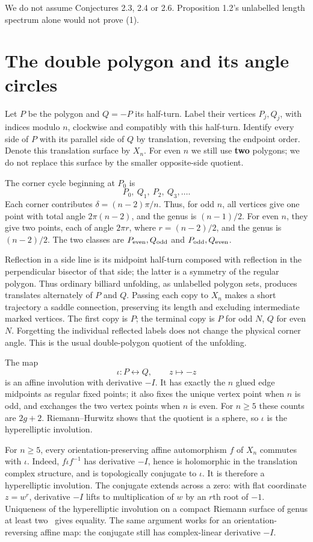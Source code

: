 \documentclass[11pt]{article}
\begin{document}
We do not assume Conjectures 2.3, 2.4 or 2.6. Proposition 1.2's unlabelled length spectrum alone would not prove (1).

\section{The double polygon and its angle circles}

Let \(P\) be the polygon and \(Q=-P\) its half-turn. Label their vertices \(P_j,Q_j\), with indices modulo \(n\), clockwise and compatibly with this half-turn. Identify every side of \(P\) with its parallel side of \(Q\) by translation, reversing the endpoint order. Denote this translation surface by \(X_n\). For even \(n\) we still use \textbf{two} polygons; we do not replace this surface by the smaller opposite-side quotient.

The corner cycle beginning at \(P_0\) is
\[
P_0,\ Q_1,\ P_2,\ Q_3,\ldots .
\tag{3}
\]
Each corner contributes \(\delta=(n-2)\pi/n\). Thus, for odd \(n\), all vertices give one point with total angle \(2\pi(n-2)\), and the genus is \((n-1)/2\). For even \(n\), they give two points, each of angle \(2\pi r\), where \(r=(n-2)/2\), and the genus is \((n-2)/2\). The two classes are \(P_{\rm even},Q_{\rm odd}\) and \(P_{\rm odd},Q_{\rm even}\).

Reflection in a side line is its midpoint half-turn composed with reflection in the perpendicular bisector of that side; the latter is a symmetry of the regular polygon. Thus ordinary billiard unfolding, as unlabelled polygon sets, produces translates alternately of \(P\) and \(Q\). Passing each copy to \(X_n\) makes a short trajectory a saddle connection, preserving its length and excluding intermediate marked vertices. The first copy is \(P\); the terminal copy is \(P\) for odd \(N\), \(Q\) for even \(N\). Forgetting the individual reflected labels does not change the physical corner angle. This is the usual double-polygon quotient of the unfolding.

The map
\[
\iota:P\longleftrightarrow Q,\qquad z\longmapsto-z
\tag{4}
\]
is an affine involution with derivative \(-I\). It has exactly the \(n\) glued edge midpoints as regular fixed points; it also fixes the unique vertex point when \(n\) is odd, and exchanges the two vertex points when \(n\) is even. For \(n\ge5\) these counts are \(2g+2\). Riemann--Hurwitz shows that the quotient is a sphere, so \(\iota\) is the hyperelliptic involution.

For \(n\ge5\), every orientation-preserving affine automorphism \(f\) of \(X_n\) commutes with \(\iota\). Indeed, \(f\iota f^{-1}\) has derivative \(-I\), hence is holomorphic in the translation complex structure, and is topologically conjugate to \(\iota\). It is therefore a hyperelliptic involution. The conjugate extends across a zero: with flat coordinate \(z=w^r\), derivative \(-I\) lifts to multiplication of \(w\) by an \(r\)th root of \(-1\). Uniqueness of the hyperelliptic involution on a compact Riemann surface of genus at least two~\cite[Theorem~3.1, with quotient genus zero]{Tyszkowska} gives equality. The same argument works for an orientation-reversing affine map: the conjugate still has complex-linear derivative \(-I\).
\end{document}
